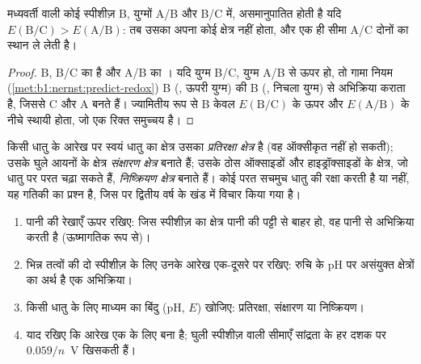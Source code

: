 \begin{proposition}[असमानुपातन की कसौटी]\label{prop:b1:e-ph-diagrams:disproportionation-criterion}
मध्यवर्ती  वाली कोई स्पीशीज़ B, युग्मों A/B और
B/C में, असमानुपातित होती है यदि $E(\mathrm{B}/\mathrm{C}) > E(\mathrm{A}/\mathrm{B})$:
तब उसका अपना कोई क्षेत्र नहीं होता, और एक ही सीमा A/C दोनों का
स्थान ले लेती है।
\end{proposition}

\begin{proof}
B, B/C का  है और A/B का । यदि युग्म B/C, युग्म A/B से
ऊपर हो, तो गामा नियम (\cref{met:b1:nernst:predict-redox}) B
(, ऊपरी युग्म) की B (, निचला युग्म) से अभिक्रिया कराता है, जिससे C
और A बनते हैं। ज्यामितीय रूप से B केवल $E(\mathrm{B}/\mathrm{C})$ के ऊपर
और $E(\mathrm{A}/\mathrm{B})$ के नीचे स्थायी होता, जो एक रिक्त समुच्चय है।
\end{proof}

\begin{definition}[प्रतिरक्षा, संक्षारण और निष्क्रियण क्षेत्र]\label{def:b1:e-ph-diagrams:corrosion-domains}
किसी धातु के आरेख पर स्वयं धातु का क्षेत्र उसका
\emph{प्रतिरक्षा क्षेत्र} है (वह ऑक्सीकृत नहीं हो सकती);
उसके घुले आयनों के क्षेत्र \emph{संक्षारण
क्षेत्र} बनाते हैं; उसके ठोस ऑक्साइडों और
हाइड्रॉक्साइडों के क्षेत्र, जो धातु पर परत चढ़ा सकते हैं, \emph{निष्क्रियण
क्षेत्र} बनाते हैं। कोई परत सचमुच धातु की रक्षा करती है या नहीं,
यह गतिकी का प्रश्न है, जिस पर द्वितीय वर्ष के खंड में विचार किया गया है।
\end{definition}

\begin{method}[आरेख पढ़ना]\label{met:b1:e-ph-diagrams:read}
\begin{enumerate}
  \item पानी की रेखाएँ ऊपर रखिए: जिस स्पीशीज़ का क्षेत्र
        पानी की पट्टी से बाहर हो, वह पानी से अभिक्रिया करती है (ऊष्मागतिक रूप से)।
  \item भिन्न तत्वों की दो स्पीशीज़ के लिए उनके आरेख एक-दूसरे पर रखिए:
        रुचि के pH पर असंयुक्त क्षेत्रों का अर्थ है एक अभिक्रिया।
  \item किसी धातु के लिए माध्यम का बिंदु (pH, $E$) खोजिए: प्रतिरक्षा,
        संक्षारण या निष्क्रियण।
  \item याद रखिए कि आरेख एक  के लिए बना है;
        घुली स्पीशीज़ वाली सीमाएँ सांद्रता के हर दशक पर $0.059/n$~V
        खिसकती हैं।
\end{enumerate}
\end{method}

